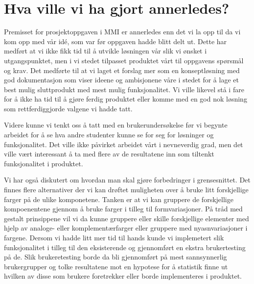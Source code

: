 \section{Hva ville vi ha gjort annerledes?}
Premisset for prosjektoppgaven i MMI er annerledes enn det vi la opp til da vi kom opp med vår idé, som var før oppgaven hadde blitt delt ut. Dette har medført at vi ikke fikk tid til å utvikle løsningen vår slik vi ønsket i utgangspunktet, men i vi stedet tilpasset produktet vårt til oppgavens spørsmål og krav.
Det medførte til at vi laget et forslag mer som en konseptløsning med god dokumentasjon som viser ideene og ambisjonene våre i stedet for å lage et best mulig sluttprodukt med mest mulig funksjonalitet. Vi ville likevel stå i fare for å ikke ha tid til å gjøre ferdig produktet eller komme med en god nok løsning som rettferdiggjorde valgene vi hadde tatt.

Videre kunne vi tenkt oss å tatt med en brukerundersøkelse før vi begynte arbeidet for å se hva andre studenter kunne se for seg for løsninger og funksjonalitet. Det ville ikke påvirket arbeidet vårt i nevneverdig grad, men det ville vært interessant å ta med flere av de resultatene inn som tiltenkt funksjonalitet i produktet.

Vi har også diskutert om hvordan man skal gjøre forbedringer i grensesnittet. Det finnes flere alternativer der vi kan drøftet muligheten over å bruke litt forskjellige farger på de ulike komponetene. Tanken er at vi kan gruppere de forskjellige kompoenentene gjennom å bruke farger i tilleg til formvariasjoner. På tråd med gestalt prinsippene vil vi da kunne gruppere eller skille forskjellige elementer med hjelp av analoge- eller komplementærfarger eller gruppere med nyasnvariasjoner i fargene. Dersom vi hadde litt mer tid til hands kunde vi implemetert slik funksjonalitet i tilleg til den eksisterende og gjennomført en ekstra brukertesting på de. Slik brukeretesting borde da bli gjennomført på mest sannsynnerlig brukergrupper og tolke resultatene mot en hypotese for å statistik finne ut hvilken av disse som brukere foretrekker eller borde implementeres i produktet.


